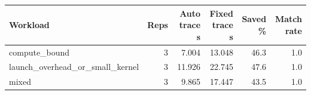 \begin{tabular}{lrrrrr}
\hline
Workload & Reps & Auto trace s & Fixed trace s & Saved \% & Match rate \\
\hline
compute_bound & 3 & 7.004 & 13.048 & 46.3 & 1.0 \\
launch_overhead_or_small_kernel & 3 & 11.926 & 22.745 & 47.6 & 1.0 \\
mixed & 3 & 9.865 & 17.447 & 43.5 & 1.0 \\
\hline
\end{tabular}
